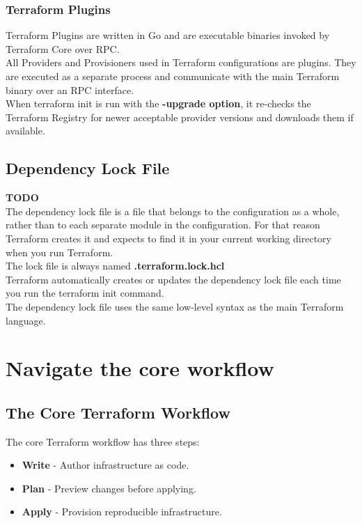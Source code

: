 \documentclass[12pt, letterpaper, twoside]{article}
\begin{document}
\subsubsection{Terraform Plugins}
Terraform Plugins are written in Go and are executable binaries invoked by 
Terraform Core over RPC.\\
All Providers and Provisioners used in Terraform configurations are plugins. 
They are executed as a separate process and communicate with the main Terraform binary 
over an RPC interface.\\

When terraform init is run with the \textbf{-upgrade option}, it re-checks the 
Terraform Registry for newer acceptable provider versions and downloads them if available.

\subsection{Dependency Lock File}
\textbf{TODO}\\

The dependency lock file is a file that belongs to the configuration as a whole, 
rather than to each separate module in the configuration. 
For that reason Terraform creates it and expects to find it in your current 
working directory when you run Terraform.\\

The lock file is always named \textbf{.terraform.lock.hcl}\\

Terraform automatically creates or updates the dependency lock file each time you 
run the terraform init command.\\
The dependency lock file uses the same low-level syntax as the main Terraform language.\\

\section{Navigate the core workflow}
\subsection{The Core Terraform Workflow}
The core Terraform workflow has three steps:
\begin{itemize}
    \item \textbf{Write} - Author infrastructure as code.
    \item \textbf{Plan} - Preview changes before applying.
    \item \textbf{Apply} - Provision reproducible infrastructure.
\end{itemize}
\end{document}
